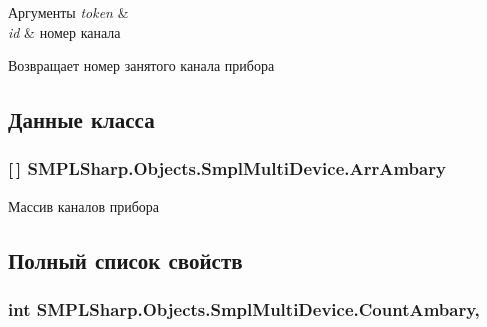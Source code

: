 \begin{DoxyParams}{Аргументы}
{\em token} & \\
\hline
{\em id} & номер канала\\
\hline
\end{DoxyParams}
\begin{DoxyReturn}{Возвращает}
номер занятого канала прибора
\end{DoxyReturn}


\subsection{Данные класса}
\hypertarget{class_s_m_p_l_sharp_1_1_objects_1_1_smpl_multi_device_a79eb6ab1f7b988772404220d27fa78b0}{
\subsubsection[{Arr\-Ambary}]{ \mbox{[}$\,$\mbox{]} S\-M\-P\-L\-Sharp.\-Objects.\-Smpl\-Multi\-Device.\-Arr\-Ambary}}\label{d8/d23/class_s_m_p_l_sharp_1_1_objects_1_1_smpl_multi_device_a79eb6ab1f7b988772404220d27fa78b0}


Массив каналов прибора 



\subsection{Полный список свойств}
\hypertarget{class_s_m_p_l_sharp_1_1_objects_1_1_smpl_multi_device_aefb2897375082ae37730737eedf4c1ec}{
\subsubsection[{Count\-Ambary}]{\setlength{\rightskip}{0pt plus 5cm}int S\-M\-P\-L\-Sharp.\-Objects.\-Smpl\-Multi\-Device.\-Count\-Ambary\hspace{0.3cm}{\ttfamily [get]}, {\ttfamily [set]}}}\label{d8/d23/class_s_m_p_l_sharp_1_1_objects_1_1_smpl_multi_device_aefb2897375082ae37730737eedf4c1ec}


